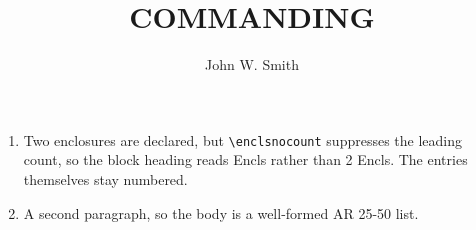 \documentclass{../armymemo}
\author{John W. Smith}\rank{CPT}\branch{CY}
\title{COMMANDING}
\begin{document}
\begin{enumerate}
	\item Two enclosures are declared, but \verb|\enclsnocount| suppresses the leading
	      count, so the block heading reads Encls rather than 2 Encls. The entries
	      themselves stay numbered.
	\item A second paragraph, so the body is a well-formed AR 25-50 list.
\end{enumerate}
\end{document}
